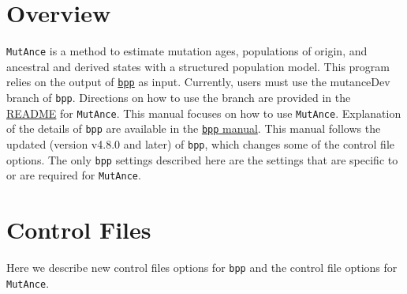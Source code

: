 \documentclass[11pt]{article}
\begin{document}
\maketitle
\section{Overview}\label{overview}
\texttt{MutAnce} is a method to estimate mutation ages, populations of origin, and ancestral and derived states with a structured population model. 
This program relies on the output of \href{https://github.com/bpp/bpp}{\texttt{bpp}} as input.
Currently, users must use the mutanceDev branch of \texttt{bpp}. 
Directions on how to use the branch are provided in the \href{https://github.com/nage0178/MutAnce}{README} for \texttt{MutAnce}. 
This manual focuses on how to use \texttt{MutAnce}. 
Explanation of the details of \texttt{bpp} are available in the \href{https://bpp.github.io/bpp-manual/}{\texttt{bpp} manual}. 
This manual follows the updated (version v4.8.0 and later) of \texttt{bpp}, which changes some of the control file options.
The only \texttt{bpp} settings described here are the settings that are specific to or are required for \texttt{MutAnce}.


\section{Control Files}\label{control}
Here we describe new control files options for \texttt{bpp} and the control file options for \texttt{MutAnce}.
\end{document}
